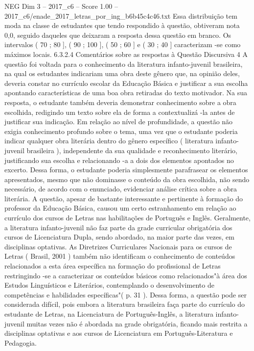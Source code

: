 \begin{textsample}{NEG Dim 3 – 2017\_c6 – Score 1.00 – 2017\_c6/enade\_2017\_letras\_por\_ing\_b6b45c4c46.txt}
Essa distribuição tem moda na classe de estudantes que tendo respondido à questão, obtiveram nota 0,0, seguido daqueles que deixaram a resposta dessa questão em branco.
Os intervalos ( 70 ; 80 ], ( 90 ; 100 ], ( 50 ; 60 ] e ( 30 ; 40 ] caracterizam -se como máximos locais. 6.3.2.4 Comentários sobre as respostas à Questão Discursiva 4 A questão foi voltada para o conhecimento da literatura infanto-juvenil brasileira, na qual os estudantes indicariam uma obra deste gênero que, na opinião deles, deveria constar no currículo escolar da Educação Básica e justificar a sua escolha apontando características de uma boa obra retiradas do texto motivador.
Na sua resposta, o estudante também deveria demonstrar conhecimento sobre a obra escolhida, redigindo um texto sobre ela de forma a contextualizá -la antes de justificar sua indicação.
Em relação ao nível de profundidade, a questão não exigia conhecimento profundo sobre o tema, uma vez que o estudante poderia indicar qualquer obra literária dentro do gênero específico ( literatura infanto-juvenil brasileira ), independente da sua qualidade e reconhecimento literário, justificando sua escolha e relacionando -a a dois dos elementos apontados no excerto.
Dessa forma, o estudante poderia simplesmente parafrasear os elementos apresentados, mesmo que não dominasse o conteúdo da obra escolhida, não sendo necessário, de acordo com o enunciado, evidenciar análise crítica sobre a obra literária.
A questão, apesar de bastante interessante e pertinente à formação do professor da Educação Básica, causou um certo estranhamento em relação ao currículo dos cursos de Letras nas habilitações de Português e Inglês.
Geralmente, a literatura infanto-juvenil não faz parte da grade curricular obrigatória dos cursos de Licenciatura Dupla, sendo abordado, na maior parte das vezes, em disciplinas optativas.
As Diretrizes Curriculares Nacionais para os cursos de Letras ( Brasil, 2001 ) também não identificam o conhecimento de conteúdos relacionados a esta área específica na formação do profissional de Letras restringindo -se a caracterizar os conteúdos básicos como relacionados"à área dos Estudos Linguísticos e Literários, contemplando o desenvolvimento de competências e habilidades específicas"( p. 31 ).
Dessa forma, a questão pode ser considerada difícil, pois embora a literatura brasileira faça parte do currículo do estudante de Letras, na Licenciatura de Português-Inglês, a literatura infanto-juvenil muitas vezes não é abordada na grade obrigatória, ficando mais restrita a disciplinas optativas e aos cursos de Licenciatura em Português-Literatura e Pedagogia.

\end{textsample}

